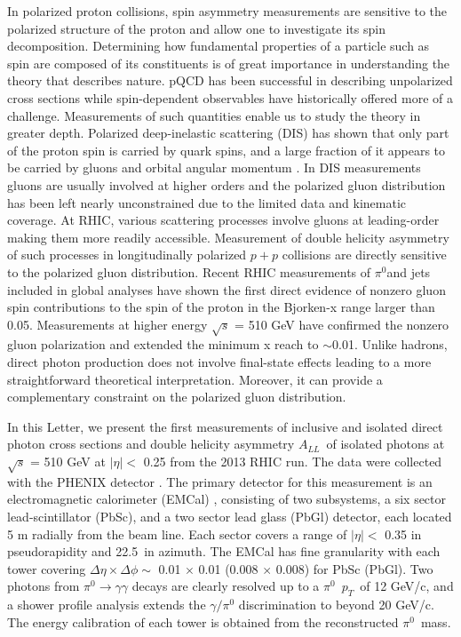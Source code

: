 \documentclass[twocolumn,letterpaper,aps,prl,longbibliography,superscriptaddress,floatfix]{revtex4-2}
\newcommand{\pT}{\ensuremath{p_T}}
\newcommand{\pizero}{\ensuremath{\pi^0}}
\newcommand{\ALL}{\ensuremath{A_{LL}}}
\begin{document}
In polarized proton collisions, spin asymmetry measurements are sensitive to the polarized structure of the proton and allow one to investigate its spin decomposition. Determining how fundamental properties of a particle such as spin are composed of its constituents is of great importance in understanding the theory that describes nature. pQCD has been successful in describing unpolarized cross sections while spin-dependent observables have historically offered more of a challenge. Measurements of such quantities enable us to study the theory in greater depth. Polarized deep-inelastic scattering (DIS) has shown that only part of the proton spin is carried by quark spins, and a large fraction of it appears to be carried by gluons and orbital angular momentum \cite{1988364, ALEXAKHIN20078}. In DIS measurements gluons are usually involved at higher orders and the polarized gluon distribution has been left nearly unconstrained due to the limited data and kinematic coverage. At RHIC, various scattering processes involve gluons at leading-order making them more readily accessible. Measurement of double helicity asymmetry of such processes in longitudinally polarized $p+p$ collisions are directly sensitive to the polarized gluon distribution. Recent RHIC measurements of \pizero and jets \cite{PhysRevD.90.012007, PhysRevLett.103.012003, PhysRevD.79.012003, PhysRevD.86.032006, PhysRevLett.115.092002} included in global analyses have shown the first direct evidence of nonzero gluon spin contributions to the spin of the proton \cite{PhysRevLett.113.012001} in the Bjorken-x range larger than 0.05. Measurements at higher energy $\sqrt{s}$ = 510 GeV \cite{PhysRevD.93.011501, PhysRevD.100.052005} have confirmed the nonzero gluon polarization and extended the minimum x reach to $\sim$0.01. Unlike hadrons, direct photon production does not involve final-state effects leading to a more straightforward theoretical interpretation. Moreover, it can provide a complementary constraint on the polarized gluon distribution.

In this Letter, we present the first measurements of inclusive and isolated direct photon cross sections and double helicity asymmetry \ALL\ of isolated photons at $\sqrt{s}$ = 510 GeV at $|\eta| <$ 0.25 from the 2013 RHIC run. The data were collected with the PHENIX detector \cite{ADCOX2003469}. The primary detector for this measurement is an electromagnetic calorimeter (EMCal) \cite{APHECETCHE2003521}, consisting of two subsystems, a six sector lead-scintillator (PbSc), and a two sector lead glass (PbGl) detector, each located 5 m radially from the beam line. Each sector covers a range of  $|\eta| <$ 0.35 in pseudorapidity and 22.5\textdegree\ in azimuth. The EMCal has fine granularity with each tower covering $\Delta\eta \times \Delta\phi \sim$ 0.01 $\times$ 0.01 (0.008 $\times$ 0.008) for PbSc (PbGl). Two photons from $\pi^0 \rightarrow \gamma\gamma$ decays are clearly resolved up to a \pizero\ \pT\ of 12 GeV/c, and a shower profile analysis extends the $\gamma/\pi^0$ discrimination to beyond 20 GeV/c. The energy calibration of each tower is obtained from the reconstructed \pizero\ mass.
\end{document}
